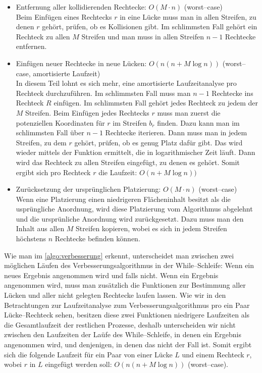 \begin{itemize}
\begin{itemize}
		\item Entfernung aller kollidierenden Rechtecke: $O(M \cdot n)$ (worst--case)\\
		Beim Einfügen eines Rechtecks $r$ in eine Lücke muss man in allen Streifen, zu denen $r$
		gehört, prüfen, ob es Kollisionen gibt.
		Im schlimmsten Fall gehört ein Rechteck zu allen $M$ Streifen und man muss in allen
		Streifen $n-1$ Rechtecke entfernen.

		\item Einfügen neuer Rechtecke in neue Lücken: $O(n(n + M \log n))$ (worst--case, amortisierte Laufzeit)\\
		In diesem Teil lohnt es sich mehr, eine amortisierte Laufzeitanalyse pro Rechteck durchzuführen.
		Im schlimmsten Fall muss man $n-1$ Rechtecke ins Rechteck $R$ einfügen.
		Im schlimmsten Fall gehört jedes Rechteck zu jedem der $M$ Streifen.
		Beim Einfügen jedes Rechtecks $r$ muss man zuerst die potenziellen Koordinaten
		für $r$ im Streifen $b_r$ finden. Dazu kann man im schlimmsten Fall über $n-1$ Rechtecke iterieren.
		Dann muss man in jedem Streifen, zu dem $r$ gehört, 
		prüfen, ob es genug Platz dafür gibt.
		Das wird wieder mittels der Funktion  ermittelt,
		die in logarithmischer Zeit läuft.
		Dann wird das Rechteck zu allen Streifen eingefügt, zu denen es gehört.
		Somit ergibt sich pro Rechteck $r$ die Laufzeit: $O(n + M \log n))$

		\item Zurücksetzung der ursprünglichen Platzierung: $O(M \cdot n)$ (worst--case)\\
		Wenn eine Platzierung einen niedrigeren Flächeninhalt besitzt als 
		die usprüngliche Anordnung, wird diese Platzierung vom Algorithmus abgelehnt
		und die ursprünliche Anordnung wird zurückgesetzt.
		Dazu muss man den Inhalt aus allen $M$ Streifen kopieren, wobei es sich in jedem Streifen höchstens 
		$n$ Rechtecke befinden können.
	\end{itemize}

\end{itemize}

Wie man im \cref{algo:verbesserung} erkennt, unterscheidet man zwischen zwei möglichen
Läufen des Verbesserungsalgorithmus in der While--Schleife:
Wenn ein neues Ergebnis angenommen wird und falls nicht.
Wenn ein Ergebnis angenommen wird, muss man zusätzlich die Funktionen zur Bestimmung aller Lücken und aller nicht gelegten
Rechtecke laufen lassen.
Wie wir in den Betrachtungen zur Laufzeitanalyse zum Verbesserungsalgorithmus pro ein Paar Lücke--Rechteck 
sehen, besitzen diese zwei Funktionen niedrigere
Laufzeiten als die Gesamtlaufzeit der restlichen Prozesse, deshalb unterscheiden wir
nicht zwischen den Laufzeiten der Laüfe des While--Schleife, in denen ein Ergebnis 
angenommen wird, und denjenigen, in denen das nicht der Fall ist.
Somit ergibt sich die folgende Laufzeit für ein Paar von einer Lücke $L$ und einem Rechteck $r$,
wobei $r$ in $L$ eingefügt werden soll: $O(n(n + M \log n))$ (worst--case).


